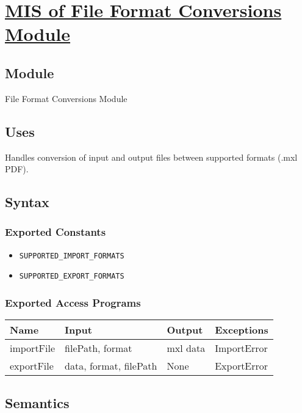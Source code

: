 \documentclass[12pt, titlepage]{article}
\begin{document}
\section{\hyperref[mFFC]{MIS of File Format Conversions Module}} \label{M6}  

\subsection{Module}  
File Format Conversions Module
\subsection{Uses}  
Handles conversion of input and output files between supported formats  (.mxl \Rightarrow PDF).  

\subsection{Syntax}  

\subsubsection{Exported Constants}  
\begin{itemize}
    \item \texttt{SUPPORTED\_IMPORT\_FORMATS}  
    \item \texttt{SUPPORTED\_EXPORT\_FORMATS}  
\end{itemize}  

\subsubsection{Exported Access Programs}  
\begin{center}  
\begin{tabular}{|p{3cm}|p{4cm}|p{4cm}|p{3cm}|}  
\hline  
\textbf{Name} & \textbf{Input} & \textbf{Output} & \textbf{Exceptions} \\  
\hline  
importFile & filePath, format & mxl data & ImportError \\  
exportFile & data, format, filePath & None & ExportError \\  
\hline  
\end{tabular}  
\end{center}  

\subsection{Semantics}  
\end{document}
